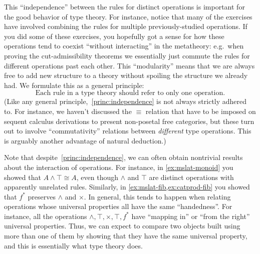 \documentclass{book}
\let\meet\wedge
\def\unit{\top}%
\begin{document}
This ``independence'' between the rules for distinct operations is important for the good behavior of type theory.
For instance, notice that many of the exercises have involved combining the rules for multiple previously-studied operations.
If you did some of these exercises, you hopefully got a sense for how these operations tend to coexist ``without interacting'' in the metatheory: e.g.\
when proving the cut-admissibility theorems we essentially just commute the rules for different operations past each other.
This ``modularity'' means that we are always free to add new structure to a theory without spoiling the structure we already had.
We formulate this as a general principle:
\begin{equation}\label{princ:independence}
  \text{Each rule in a type theory should refer to only one operation}.\tag{$\ast$}
\end{equation}
(Like any general principle,~\eqref{princ:independence} is not always strictly adhered to.
For instance, we haven't discussed the $\equiv$ relation that have to be imposed on sequent calculus derivations to present non-posetal free categories, but these turn out to involve ``commutativity'' relations between \emph{different} type operations.
This is arguably another advantage of natural deduction.)

Note that despite~\eqref{princ:independence}, we can often obtain nontrivial results about the interaction of operations.
For instance, in \cref{ex:mslat-monoid} you showed that $A\meet \top\cong A$, even though $\meet$ and $\top$ are distinct operations with apparently unrelated rules.
Similarly, in \cref{ex:mslat-fib,ex:catprod-fib} you showed that $f^*$ preserves $\meet$ and $\times$.
In general, this tends to happen when relating operations whose universal properties all have the same ``handedness''.
For instance, all the operations $\meet,\top,\times,\unit,f^*$ have ``mapping in'' or ``from the right'' universal properties.
Thus, we can expect to compare two objects built using more than one of them by showing that they have the same universal property, and this is essentially what type theory does.
\end{document}
